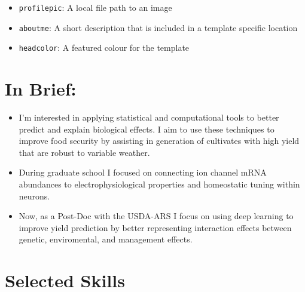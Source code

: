 \documentclass[10pt,a4paper,]{twentysecondcv}
\providecommand{\tightlist}{%
  \setlength{\itemsep}{0pt}\setlength{\parskip}{0pt}}
\begin{document}
\aboutme{}



\makeprofile %




\begin{itemize}
\tightlist
\item
  \texttt{profilepic}: A local file path to an image
\item
  \texttt{aboutme}: A short description that is included in a template
  specific location
\item
  \texttt{headcolor}: A featured colour for the template
\end{itemize}

\hypertarget{in-brief}{%
\section{In Brief:}\label{in-brief}}

\begin{itemize}
\tightlist
\item
  I'm interested in applying statistical and computational tools to
  better predict and explain biological effects. I aim to use these
  techniques to improve food security by assisting in generation of
  cultivates with high yield that are robust to variable weather.
\item
  During graduate school I focused on connecting ion channel mRNA
  abundances to electrophysiological properties and homeostatic tuning
  within neurons.
\item
  Now, as a Post-Doc with the USDA-ARS I focus on using deep learning to
  improve yield prediction by better representing interaction effects
  between genetic, enviromental, and management effects.
\end{itemize}

\hypertarget{selected-skills}{%
\section{Selected Skills}\label{selected-skills}}
\end{document}
